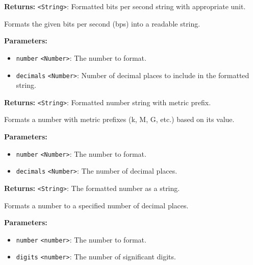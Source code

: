 \documentclass[12pt,a4paper]{article}
\begin{document}
\noindent \textbf{Returns:} \texttt{<String>}: Formatted bits per second string with appropriate unit.

\noindent Formats the given bits per second (bps) into a readable string.

\vspace{5mm}
\noindent {}


\noindent \textbf{Parameters:}
\begin{itemize}
  \item \texttt{number} \texttt{<Number>}: The number to format.
  \item \texttt{decimals} \texttt{<Number>}: Number of decimal places to include in the formatted string.
\end{itemize}

\noindent \textbf{Returns:} \texttt{<String>}: Formatted number string with metric prefix.

\noindent Formats a number with metric prefixes (k, M, G, etc.) based on its value.

\vspace{5mm}
\noindent {}


\noindent \textbf{Parameters:}
\begin{itemize}
  \item \texttt{number} \texttt{<Number>}: The number to format.
  \item \texttt{decimals} \texttt{<Number>}: The number of decimal places.
\end{itemize}

\noindent \textbf{Returns:} \texttt{<String>}: The formatted number as a string.

\noindent Formats a number to a specified number of decimal places.

\vspace{5mm}
\noindent {}


\noindent \textbf{Parameters:}
\begin{itemize}
  \item \texttt{number} \texttt{<number>}: The number to format.
  \item \texttt{digits} \texttt{<number>}: The number of significant digits.
\end{itemize}
\end{document}
